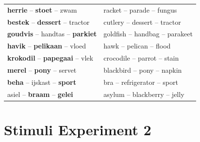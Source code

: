 \documentclass[doc]{apa6}
\begin{document}
\begin{appendix}
\begin{small}
\begin{longtable}{ll}
\textbf{herrie} -- \textbf{stoet} -- zwam & racket -- parade -- fungus\\
\textbf{bestek} -- \textbf{dessert} -- tractor & cutlery -- dessert -- tractor\\
\textbf{goudvis} -- handtas -- \textbf{parkiet} & goldfish -- handbag -- parakeet\\
\textbf{havik} -- \textbf{pelikaan} -- vloed & hawk -- pelican -- flood\\
\textbf{krokodil} -- \textbf{papegaai} -- vlek & crocodile -- parrot -- stain\\
\textbf{merel} -- \textbf{pony} -- servet & blackbird -- pony -- napkin\\
\textbf{beha} -- ijskast -- \textbf{sport} & bra -- refrigerator -- sport\\
asiel -- \textbf{braam} -- \textbf{gelei} & asylum -- blackberry -- jelly\\
\end{longtable}
\end{small}


\section{Stimuli Experiment 2}


\end{appendix}
\end{document}

